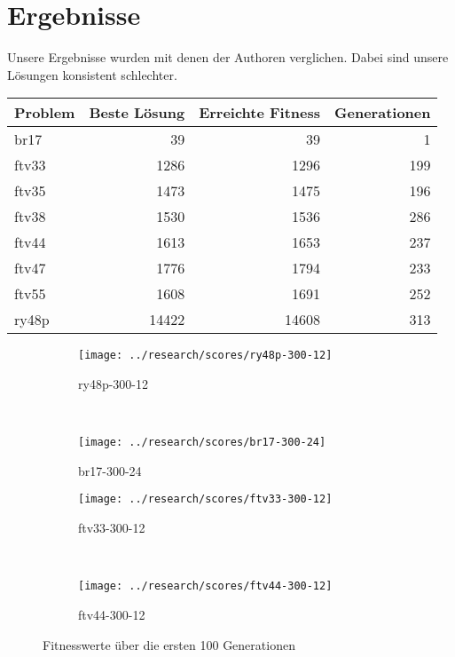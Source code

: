 \chapter{Ergebnisse}
Unsere Ergebnisse wurden mit denen der Authoren verglichen.  Dabei
sind unsere Lösungen konsistent schlechter.

{
  \setmainfont[Numbers={Uppercase,Monospaced}]{Vollkorn}
  \begin{tabular}{lrrr}
    Problem & Beste Lösung & Erreichte Fitness & Generationen \\
    \hline
    br17    & 39           & 39                & 1            \\
    ftv33   & 1286         & 1296              & 199          \\
    ftv35   & 1473         & 1475              & 196          \\
    ftv38   & 1530         & 1536              & 286          \\
    ftv44   & 1613         & 1653              & 237          \\
    ftv47   & 1776         & 1794              & 233          \\
    ftv55   & 1608         & 1691              & 252          \\
    ry48p   & 14422        & 14608             & 313          \\
  \end{tabular}
}

\begin{figure}[ht]
    \centering
    \begin{subfigure}[b]{0.45\textwidth}
      \texttt{[image: ../research/scores/ry48p-300-12]}
      \caption{ry48p-300-12}
      \label{fig:ry48p-300-12}
    \end{subfigure}
    ~ %
    \begin{subfigure}[b]{0.45\textwidth}
      \texttt{[image: ../research/scores/br17-300-24]}
      \caption{br17-300-24}
      \label{fig:br17-300-24}
    \end{subfigure}

    \begin{subfigure}[b]{0.45\textwidth}
      \texttt{[image: ../research/scores/ftv33-300-12]}
      \caption{ftv33-300-12}
      \label{fig:ftv33-300-12}
    \end{subfigure}
    ~
    \begin{subfigure}[b]{0.45\textwidth}
      \texttt{[image: ../research/scores/ftv44-300-12]}
      \caption{ftv44-300-12}
      \label{fig:ftv44-300-12}
    \end{subfigure}
    \caption{\label{fig:fitness-plots} Fitnesswerte über die ersten
      100 Generationen}
\end{figure}
